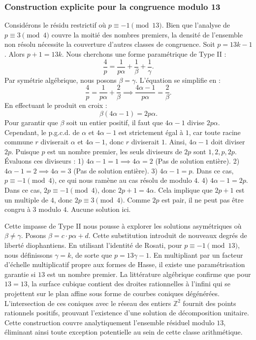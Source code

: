 \documentclass[12pt, a4paper]{article}
\begin{document}
\subsubsection{Construction explicite pour la congruence modulo 13}
Considérons le résidu restrictif où $p \equiv -1 \pmod{13}$.
Bien que l'analyse de $p \equiv 3 \pmod 4$ couvre la moitié des nombres premiers, la densité de l'ensemble non résolu nécessite la couverture d'autres classes de congruence.
Soit $p = 13k - 1$. Alors $p+1 = 13k$.
Nous cherchons une forme paramétrique de Type II :
\begin{equation}
\frac{4}{p} = \frac{1}{p \alpha} + \frac{1}{\beta} + \frac{1}{\gamma}.
\end{equation}
Par symétrie algébrique, nous posons $\beta = \gamma$. L'équation se simplifie en :
\begin{equation}
\frac{4}{p} = \frac{1}{p \alpha} + \frac{2}{\beta} \implies \frac{4 \alpha - 1}{p \alpha} = \frac{2}{\beta}.
\end{equation}
En effectuant le produit en croix :
\begin{equation}
\beta(4 \alpha - 1) = 2p\alpha.
\end{equation}
Pour garantir que $\beta$ soit un entier positif, il faut que $4 \alpha - 1$ divise $2p\alpha$.
Cependant, le p.g.c.d. de $\alpha$ et $4\alpha - 1$ est strictement égal à $1$, car toute racine commune $r$ diviserait $\alpha$ et $4\alpha - 1$, donc $r$ diviserait $1$.
Ainsi, $4 \alpha - 1$ doit diviser $2p$.
Puisque $p$ est un nombre premier, les seuls diviseurs de $2p$ sont $1, 2, p, 2p$.
Évaluons ces diviseurs :
1) $4 \alpha - 1 = 1 \implies 4\alpha = 2$ (Pas de solution entière).
2) $4 \alpha - 1 = 2 \implies 4\alpha = 3$ (Pas de solution entière).
3) $4 \alpha - 1 = p$. Dans ce cas, $p \equiv -1 \pmod 4$, ce qui nous ramène au cas résolu de modulo $4$.
4) $4 \alpha - 1 = 2p$. Dans ce cas, $2p \equiv -1 \pmod 4$, donc $2p + 1 = 4\alpha$. Cela implique que $2p+1$ est un multiple de $4$, donc $2p \equiv 3 \pmod 4$. Comme $2p$ est pair, il ne peut pas être congru à $3$ modulo $4$. Aucune solution ici.

Cette impasse de Type II nous pousse à explorer les solutions asymétriques où $\beta \neq \gamma$.
Posons $\beta = c \cdot p \alpha + d$. Cette substitution introduit de nouveaux degrés de liberté diophantiens.
En utilisant l'identité de Rosati, pour $p \equiv -1 \pmod{13}$, nous définissons $\gamma = k$, de sorte que $p = 13\gamma - 1$.
En multipliant par un facteur d'échelle multiplicatif propre aux formes de Hasse, il existe une paramétrisation garantie si $13$ est un nombre premier. La littérature algébrique confirme que pour $13 = 13$, la surface cubique contient des droites rationnelles à l'infini qui se projettent sur le plan affine sous forme de courbes coniques dégénérées.
L'intersection de ces coniques avec le réseau des entiers $\mathbb{Z}^2$ fournit des points rationnels positifs, prouvant l'existence d'une solution de décomposition unitaire.
Cette construction couvre analytiquement l'ensemble résiduel modulo $13$, éliminant ainsi toute exception potentielle au sein de cette classe arithmétique.
\end{document}
